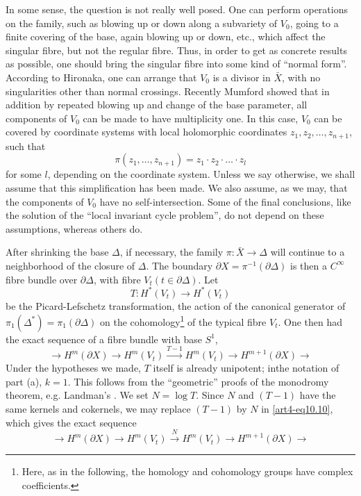 In some sense, the question is not really well posed. One can perform operations on the family, such as blowing up or down along a subvariety of $V_0$, going to a finite covering of the base, again blowing up or down, etc., which affect the singular fibre, but not the regular fibre. Thus, in order to get as concrete results as possible, one should bring the singular fibre into some kind of ``normal form''. According to Hironaka, one can arrange that $V_0$ is a divisor in $\bar{X}$, with no singularities other than normal crossings. Recently Mumford showed that in addition by repeated blowing up and change of the base parameter, all components of $V_0$ can be made to have multiplicity one. In this case, $V_0$ can be covered by coordinate systems with local holomorphic coordinates $z_1, z_2, \ldots, z_{n+1}$, such that
$$
\pi(z_1, \ldots, z_{n+1}) = z_1 \cdot z_2 \cdot \ldots \cdot z_l
$$
for some $l$, depending on the coordinate system. Unless we say otherwise, we shall assume that this simplification has been made. We also assume, as we may, that the components of $V_0$ have no self-intersection. Some of the final conclusions, like the solution of the ``local invariant cycle problem'', do not depend on these assumptions, whereas others do.

After shrinking the base $\Delta$, if necessary, the family $\pi : \bar{X} \to \Delta$ will continue to a neighborhood of the closure of $\Delta$. The boundary $\partial X = \pi^{-1} (\partial \Delta)$ is then a $C^\infty$ fibre bundle over $\partial \Delta$, with fibre $V_t (t \in \partial \Delta)$. Let 
$$
T : H^\ast (V_t ) \longrightarrow H^\ast (V_t)
$$
be the Picard-Lefschetz transformation, \ie the action of the canonical generator of $\pi_1 (\Delta^\ast) = \pi_1 (\partial\Delta)$ on the cohomology\footnote[43]{Here, as in the following, the homology and cohomology groups have complex coefficients.} of the typical fibre $V_t$. One then had the exact sequence of a fibre bundle with base $S^1$,
\setcounter{equation}{9}
\begin{equation}\label{art4-eq10.10}
\longrightarrow H^m (\partial X) \longrightarrow H^m (V_t) \xrightarrow{T - 1} H^m (V_t) \longrightarrow  H^{m+1} (\partial X) \longrightarrow  
\end{equation}\pageoriginale
Under the hypotheses we made, $T$ itself is already unipotent; inthe notation of part (a), $k=1$. This follows from the ``geometric'' proofs of the monodromy theorem, e.g. Landman's \cite{art4-key35}. We set $N = \log T$. Since $N$ and $(T -1)$ have the same kernels and cokernels, we may replace $(T-1)$ by $N$ in \eqref{art4-eq10.10}, which gives the exact sequence
\begin{equation}\label{art4-eq10.11}
\longrightarrow H^m (\partial X) \longrightarrow H^m (V_t) \xrightarrow{N} H^m (V_t) \longrightarrow  H^{m+1} (\partial X) \longrightarrow  
\end{equation}


